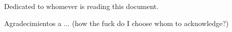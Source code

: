
\begin{dedicatory}
    Dedicated to whomever is reading this document.
  \end{dedicatory}
  
  \begin{acknowledgment}
    Agradecimientos a ... (how the fuck do I choose whom to acknowledge?)
  \end{acknowledgment}
  